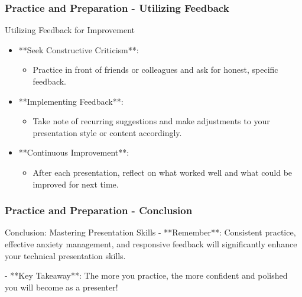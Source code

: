 \documentclass[aspectratio=169]{beamer}
\begin{document}
\begin{frame}[fragile]
    \frametitle{Practice and Preparation - Utilizing Feedback}
    \begin{block}{Utilizing Feedback for Improvement}
        \begin{itemize}
            \item **Seek Constructive Criticism**: 
            \begin{itemize}
                \item Practice in front of friends or colleagues and ask for honest, specific feedback.
            \end{itemize}
            \item **Implementing Feedback**: 
            \begin{itemize}
                \item Take note of recurring suggestions and make adjustments to your presentation style or content accordingly.
            \end{itemize}
            \item **Continuous Improvement**: 
            \begin{itemize}
                \item After each presentation, reflect on what worked well and what could be improved for next time.
            \end{itemize}
        \end{itemize}
    \end{block}
\end{frame}

\begin{frame}[fragile]
    \frametitle{Practice and Preparation - Conclusion}
    \begin{block}{Conclusion: Mastering Presentation Skills}
        - **Remember**: Consistent practice, effective anxiety management, and responsive feedback will significantly enhance your technical presentation skills.
        
        - **Key Takeaway**: The more you practice, the more confident and polished you will become as a presenter!
    \end{block}
\end{frame}
\end{document}
